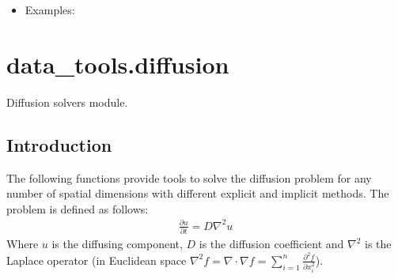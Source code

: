 \documentclass[letterpaper,10pt,english]{sphinxmanual}
\begin{document}
\begin{fulllineitems}
\begin{itemize}
\item {} \begin{description}
\item[{Examples:}] \leavevmode
{}%
\begin{sphinxVerbatim}[commandchars=\\\{\}]
  \PYG{p}{[}  \PYG{p}{]}
 
\end{sphinxVerbatim}

\end{description}

\end{itemize}

\end{fulllineitems}

\label{\detokenize{diffusion:module-data_tools.diffusion}}

\section{data\_tools.diffusion}
\label{\detokenize{diffusion:data-tools-diffusion}}\label{\detokenize{diffusion::doc}}
Diffusion solvers module.


\subsection{Introduction}
\label{\detokenize{diffusion:introduction}}
The following functions provide tools to solve the diffusion problem for
any number of spatial dimensions with different explicit and implicit
methods. The problem is defined as follows:
\begin{equation*}
\begin{split}\frac{\partial u}{\partial t} = D\nabla^2u\end{split}
\end{equation*}
Where \(u\) is the diffusing component, \(D\) is the diffusion
coefficient and \(\nabla^2\) is the Laplace operator
(in Euclidean space \(\nabla^2f=\nabla\cdot\nabla f=\sum_{i=1}^n\frac{\partial^2 f}{\partial x_i^2}\)).
\end{document}
